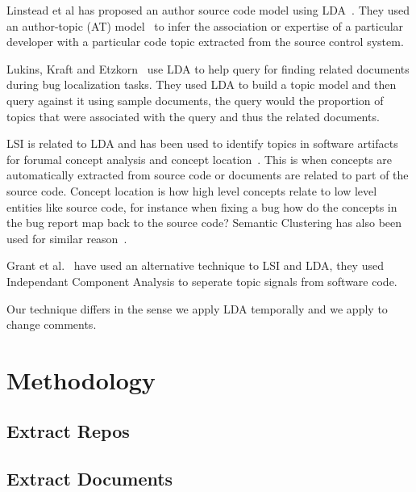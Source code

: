 \documentclass[times, 10pt,twocolumn]{article}
\begin{document}
Linstead et al has proposed an author source code model using
LDA~\cite{10.1109/MSR.2007.20,NIPS2007637,1321709}. They used an
author-topic (AT) model~\cite{1036902} to infer the association or
expertise of a particular developer with a particular code topic
extracted from the source control system.

Lukins, Kraft and Etzkorn~\cite{lukins2008} use LDA to help query for
finding related documents during bug localization tasks. They used LDA
to build a topic model and then query against it using sample
documents, the query would the proportion of topics that were
associated with the query and thus the related documents.

LSI is related to LDA and has been used to identify topics in software
artifacts for forumal concept analysis and concept
location~\cite{1421013,1374321,10.1109/ICPC.2007.13,10.1109/ICPC.2006.17}.
This is when concepts are automatically extracted from source code or
documents are related to part of the source code.  Concept location is
how high level concepts relate to low level entities like source code,
for instance when fixing a bug how do the concepts in the bug report
map back to the source code?  Semantic Clustering has also been used
for similar reason~\cite{1698774,1566153}.

Grant et al.~\cite{scottcordy} have used an alternative technique to
LSI and LDA, they used Independant Component Analysis to seperate
topic signals from software code.

Our technique differs in the sense we apply LDA temporally and we
apply to change comments.




\section{Methodology}

\subsection{Extract Repos}
\subsection{Extract Documents}
\end{document}
